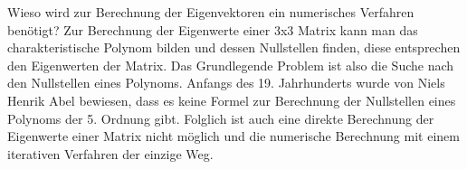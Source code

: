 \begin{refsection}
Wieso wird zur Berechnung der Eigenvektoren ein numerisches Verfahren benötigt?
Zur Berechnung der Eigenwerte einer 3x3 Matrix kann man das charakteristische Polynom bilden und dessen Nullstellen finden, diese entsprechen den Eigenwerten der Matrix.
Das Grundlegende Problem ist also die Suche nach den Nullstellen eines Polynoms.
Anfangs des 19. Jahrhunderts wurde von Niels Henrik Abel bewiesen, dass es keine Formel zur Berechnung der Nullstellen eines Polynoms der 5. Ordnung gibt.
Folglich ist auch eine direkte Berechnung der Eigenwerte einer Matrix nicht möglich und die numerische Berechnung mit einem iterativen Verfahren der einzige Weg.







\printbibliography[heading=subbibliography]
\end{refsection}
